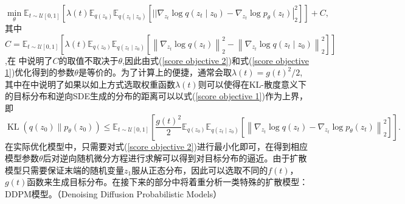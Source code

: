 \begin{equation}
    \min _{{\theta}} \mathbb{E}_{t \sim \mathcal{U}[0,1]}\left[\lambda(t) \mathbb{E}_{q\left({z}_0\right)} \mathbb{E}_{q\left({z}_t \mid {z}_0\right)}\left[|| \nabla_{{z}_t} \log q\left({z}_t \mid {z}_0\right)-\left.\nabla_{{z}_t} \log p_{{\theta}}\left({z}_t\right)\right|_2 ^2\right]\right]+C,
    \label{score objective 2}
\end{equation}
其中$C=\mathbb{E}_{t \sim \mathcal{U}[0,1]}\left[\lambda(t) \mathbb{E}_{q\left({z}_0\right)} \mathbb{E}_{q\left({z}_t \mid {z}_0\right)}\left[\left\|\nabla_{{z}_t} \log q\left({z}_t\right)\right\|_2^2-\left\|\nabla_{{z}_t} \log q\left({z}_t \mid {z}_0\right)\right\|_2^2\right]\right]$,在
\cite{vincent}中说明了$C$的取值不取决于$\theta$,因此由式(\ref{score objective 2})和式(\ref{score objective 1})优化得到的参数$\theta$是等价的。为了计算上的便捷，通常会取$\lambda(t) = g(t)^2/2$, 其中在\cite{song_2}中说明了如果以如上方式选取权重函数$\lambda(t)$则可以使得在KL-散度意义下的目标分布和逆向SDE生成的分布的距离可以以式(\ref{score objective 1})作为上界，即
\begin{equation}
\operatorname{KL}\left(q\left({z}_0\right) \| p_{{\theta}}\left({z}_0\right)\right) \leq \mathbb{E}_{t \sim \mathcal{U}[0,1]}\left[\frac{g(t)^2}{2} \mathbb{E}_{q\left({z}_0\right)} \mathbb{E}_{q\left({z}_t \mid {z}_0\right)}\left[\left\|\nabla_{{z}_t} \log q\left({z}_t\right)-\nabla_{{z}_t} \log p_{{\theta}}\left({z}_t\right)\right\|_2^2\right]\right].
    \label{KL upper bound 1}
\end{equation}
在实际优化模型中，只需要对式(\ref{score objective 2})进行最小化即可，在得到相应模型参数$\theta$后对逆向随机微分方程进行求解可以得到对目标分布的逼近。由于扩散模型只需要保证末端的随机变量$z_1$服从正态分布，因此可以选取不同的$f(t)$，$g(t)$函数来生成目标分布。在接下来的部分中将着重分析一类特殊的扩散模型：DDPM模型。（Denoising Diffusion Probabilistic Models）
